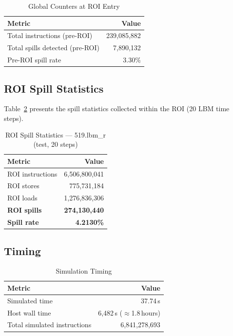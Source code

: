 \documentclass[conference]{IEEEtran}
\begin{document}
\begin{table}[H]
\centering
\caption{Global Counters at ROI Entry}
\label{tab:preroi}
\begin{tabular}{lr}
\toprule
\textbf{Metric} & \textbf{Value} \\
\midrule
Total instructions (pre-ROI) & 239,085,882 \\
Total spills detected (pre-ROI) & 7,890,132 \\
Pre-ROI spill rate & 3.30\% \\
\bottomrule
\end{tabular}
\end{table}

\subsection{ROI Spill Statistics}

Table~\ref{tab:roi} presents the spill statistics collected within
the ROI (20 LBM time steps).

\begin{table}[H]
\centering
\caption{ROI Spill Statistics --- 519.lbm\_r (test, 20 steps)}
\label{tab:roi}
\begin{tabular}{lr}
\toprule
\textbf{Metric} & \textbf{Value} \\
\midrule
ROI instructions         & 6,506,800,041 \\
ROI stores               &   775,731,184 \\
ROI loads                & 1,276,836,306 \\
\midrule
\textbf{ROI spills}      & \textbf{274,130,440} \\
\textbf{Spill rate}      & \textbf{4.2130\%} \\
\bottomrule
\end{tabular}
\end{table}

\subsection{Timing}

\begin{table}[H]
\centering
\caption{Simulation Timing}
\label{tab:timing}
\begin{tabular}{lr}
\toprule
\textbf{Metric} & \textbf{Value} \\
\midrule
Simulated time           & 37.74\,s \\
Host wall time           & 6,482\,s ($\approx$1.8\,hours) \\
Total simulated instructions & 6,841,278,693 \\
\bottomrule
\end{tabular}
\end{table}
\end{document}
